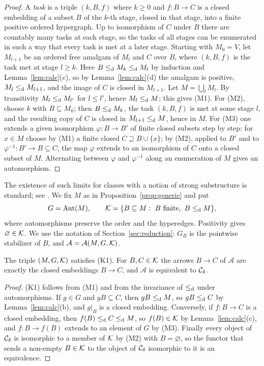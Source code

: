 \begin{proof}
A \emph{task} is a triple $(k,B,f)$ where $k\ge 0$ and $f\colon B\to C$ is a
closed embedding of a subset $B$ of the $k$-th stage, closed in that stage,
into a finite positive ordered hypergraph. Up to isomorphism of $C$ under $B$
there are countably many tasks at each stage, so the tasks of all stages can
be enumerated in such a way that every task is met at a later stage. Starting
with $M_0=V$, let $M_{l+1}$ be an ordered free amalgam of $M_l$ and $C$ over
$B$, where $(k,B,f)$ is the task met at stage $l\ge k$. Here $B\leq_{\mathrm{d}} M_k\leq_{\mathrm{d}} M_l$
by induction and Lemma~\ref{lem:calc}(c), so by Lemma~\ref{lem:calc}(d) the
amalgam is positive, $M_l\leq_{\mathrm{d}} M_{l+1}$, and the image of $C$ is closed in
$M_{l+1}$. Let $M=\bigcup_l M_l$. By transitivity $M_l\leq_{\mathrm{d}} M_{l'}$ for
$l\le l'$, hence $M_l\leq_{\mathrm{d}} M$; this gives (M1). For (M2), choose $k$ with
$B\subseteq M_k$; then $B\leq_{\mathrm{d}} M_k$, the task
$(k,B,f)$ is met at some stage $l$, and the resulting copy of $C$ is closed in
$M_{l+1}\leq_{\mathrm{d}} M$, hence in $M$. For (M3) one extends a given isomorphism
$\varphi\colon B\to B'$ of finite closed subsets step by step: for $x\in M$
choose by (M1) a finite closed $C\supseteq B\cup\{x\}$; by (M2), applied to
$B'$ and to $\varphi^{-1}\colon B'\to B\subseteq C$, the map $\varphi$ extends to
an isomorphism of $C$ onto a closed subset of $M$. Alternating between
$\varphi$ and $\varphi^{-1}$ along an enumeration of $M$ gives an automorphism.
\end{proof}

The existence of such limits for classes with a notion of strong
substructure is standard; see
\cite[Theorem~2.6]{EHN}. We fix $M$ as in Proposition~\ref{prop:generic} and put
\[
 G=\operatorname{Aut}(M),\qquad \mathcal{K}=\{B\subseteq M:\ B \text{ finite},\ B\leq_{\mathrm{d}} M\},
\]
where automorphisms preserve the order and the hyperedges. Positivity gives
$\varnothing\in\mathcal{K}$. We use the notation of Section~\ref{sec:reduction}:
$G_B$ is the pointwise stabilizer of $B$, and $\mathcal A=\mathcal A(M,G,\mathcal{K})$.

\begin{lemma}\label{lem:AMequiv}
The triple $(M,G,\mathcal{K})$ satisfies \textup{(K1)}. For $B,C\in\mathcal{K}$ the arrows
$B\to C$ of $\mathcal A$ are exactly the closed embeddings $B\to C$, and
$\mathcal A$ is equivalent to $\mathcal{C}_{\delta}$.
\end{lemma}

\begin{proof}
(K1) follows from (M1) and from the invariance of $\leq_{\mathrm{d}}$ under automorphisms.
If $g\in G$ and $gB\subseteq C$, then $gB\leq_{\mathrm{d}} M$, so $gB\leq_{\mathrm{d}} C$ by
Lemma~\ref{lem:calc}(b), and $g|_B$ is a closed embedding. Conversely, if
$f\colon B\to C$ is a closed embedding, then $f(B)\leq_{\mathrm{d}} C\leq_{\mathrm{d}} M$, so
$f(B)\in\mathcal{K}$ by Lemma~\ref{lem:calc}(c), and $f\colon B\to f(B)$ extends to an
element of $G$ by (M3). Finally every object of $\mathcal{C}_{\delta}$ is isomorphic to a member
of $\mathcal{K}$ by (M2) with $B=\varnothing$, so the functor that sends a non-empty
$B\in\mathcal{K}$ to the object of $\mathcal{C}_{\delta}$ isomorphic to it is an equivalence.
\end{proof}

